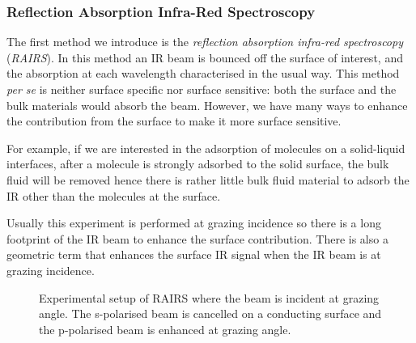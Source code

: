 \documentclass{article}
\theoremstyle{plain}\theoremheaderfont{\normalfont\itshape}\theorembodyfont{\rmfamily}\theoremseparator{.}\newtheorem*{rem}{Remark}\newtheorem*{ex}{Example}\newtheorem*{proof}{Proof}\newtheorem*{altp}{Alternative proof}
\theoremstyle{plain}\theoremheaderfont{\normalfont\bfseries}\theorembodyfont{\rmfamily}\theoremseparator{.}\newtheorem{thm}{Theorem}[section]\newtheorem{lem}[thm]{Lemma}\newtheorem{prop}[thm]{Proposition}\newtheorem*{cor}{Corollary}\newtheorem{defn}[thm]{Definition}\newtheorem{clm}[thm]{Claim}\newtheorem{clminproof}{Claim}\newtheorem*{law}{Law}\newtheorem{pos}[thm]{Postulate}
\theoremstyle{break}\theoremheaderfont{\normalfont\itshape}\theorembodyfont{\rmfamily}\theoremseparator{.\medskip}\newtheorem*{proofskip}{Proof}\newtheorem*{exs}{Examples}\newtheorem*{rems}{Remarks}
\theoremstyle{break}\theoremheaderfont{\normalfont\bfseries}\theorembodyfont{\rmfamily}\theoremseparator{.\medskip}\newtheorem{lemskip}[thm]{Lemma}\newtheorem{defnskip}[thm]{Definition}\newtheorem{propskip}[thm]{Proposition}\newtheorem{thmskip}[thm]{Theorem}
\numberwithin{equation}{section}
\begin{document}
	\subsubsection{Reflection Absorption Infra-Red Spectroscopy}

	The first method we introduce is the \textit{reflection absorption infra-red spectroscopy} (\textit{RAIRS}). In this method an IR beam is bounced off the surface of interest, and the absorption at each wavelength characterised in the usual way. This method \textit{per se} is neither surface specific nor surface sensitive: both the surface and the bulk materials would absorb the beam. However, we have many ways to enhance the contribution from the surface to make it more surface sensitive.
	
	For example, if we are interested in the adsorption of molecules on a solid-liquid interfaces, after a molecule is strongly adsorbed to the solid surface, the bulk fluid will be removed hence there is rather little bulk fluid material to adsorb the IR other than the molecules at the surface.
	
	Usually this experiment is performed at grazing incidence so there is a long footprint of the IR beam to enhance the surface contribution. There is also a geometric term that enhances the surface IR signal when the IR beam is at grazing incidence.

	\begin{figure}[ht!]
		\centering
		\caption{Experimental setup of RAIRS where the beam is incident at grazing angle. The s-polarised beam is cancelled on a conducting surface and the p-polarised beam is enhanced at grazing angle.}
	\end{figure}
\end{document}
